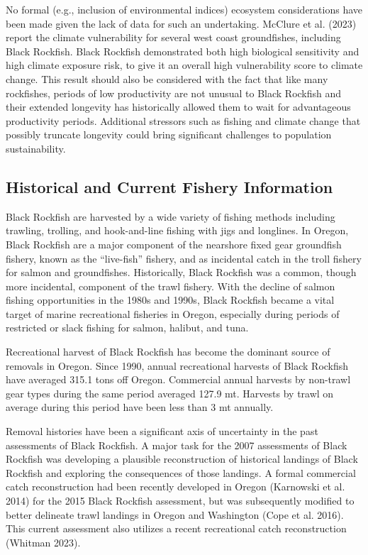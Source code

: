 \documentclass[11pt,
  english,
  letterpaper,
]{article}
\begin{document}
No formal (e.g., inclusion of environmental indices) ecosystem considerations have been made given the lack of data for such an undertaking. McClure et al. (2023) report the climate vulnerability for several west coast groundfishes, including Black Rockfish. Black Rockfish demonstrated both high biological sensitivity and high climate exposure risk, to give it an overall high vulnerability score to climate change. This result should also be considered with the fact that like many rockfishes, periods of low productivity are not unusual to Black Rockfish and their extended longevity has historically allowed them to wait for advantageous productivity periods. Additional stressors such as fishing and climate change that possibly truncate longevity could bring significant challenges to population sustainability.

\hypertarget{historical-and-current-fishery-information}{%
\subsection{Historical and Current Fishery Information}\label{historical-and-current-fishery-information}}

Black Rockfish are harvested by a wide variety of fishing methods including trawling, trolling, and hook-and-line fishing with jigs and longlines. In Oregon, Black Rockfish are a major component of the nearshore fixed gear groundfish fishery, known as the ``live-fish'' fishery, and as incidental catch in the troll fishery for salmon and groundfishes. Historically, Black Rockfish was a common, though more incidental, component of the trawl fishery. With the decline of salmon fishing opportunities in the 1980s and 1990s, Black Rockfish became a vital target of marine recreational fisheries in Oregon, especially during periods of restricted or slack fishing for salmon, halibut, and tuna.

Recreational harvest of Black Rockfish has become the dominant source of removals in Oregon. Since 1990, annual recreational harvests of Black Rockfish have averaged 315.1 tons off Oregon. Commercial annual harvests by non-trawl gear types during the same period averaged 127.9 mt. Harvests by trawl on average during this period have been less than 3 mt annually.

Removal histories have been a significant axis of uncertainty in the past assessments of Black Rockfish. A major task for the 2007 assessments of Black Rockfish was developing a plausible reconstruction of historical landings of Black Rockfish and exploring the consequences of those landings. A formal commercial catch reconstruction had been recently developed in Oregon (Karnowski et al. 2014) for the 2015 Black Rockfish assessment, but was subsequently modified to better delineate trawl landings in Oregon and Washington (Cope et al. 2016). This current assessment also utilizes a recent recreational catch reconstruction (Whitman 2023).
\end{document}
